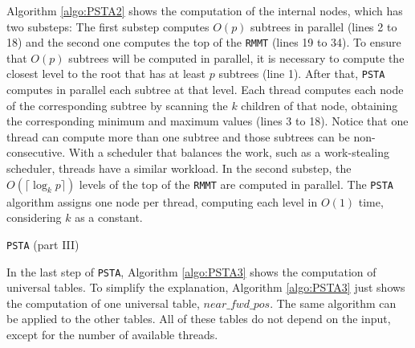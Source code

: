 Algorithm \ref{algo:PSTA2} shows the computation of the internal
nodes, which has two substeps: The first substep computes $O(p)$
subtrees in parallel (lines 2 to 18) and the second one computes the
top of the {\tt RMMT} (lines 19 to 34). To ensure that $O(p)$ subtrees
will be computed in parallel, it is necessary to compute the closest
level to the root that has at least $p$ subtrees (line 1). After that,
{\tt PSTA} computes in parallel each subtree at that level. Each
thread computes each node of the corresponding subtree by scanning the
$k$ children of that node, obtaining the corresponding minimum and
maximum values (lines 3 to 18). Notice that one thread can compute
more than one subtree and those subtrees can be non-consecutive. With
a scheduler that balances the work, such as a work-stealing scheduler,
threads have a similar workload. In the second substep, the $O(\lceil
\log_{k}p \rceil)$ levels of the top of the {\tt RMMT} are computed in
parallel. The {\tt PSTA} algorithm assigns one node per thread,
computing each level in $O(1)$ time, considering $k$ as a constant.


\begin{algorithm}[t]
\small
\SetVlineSkip{-2cm}
  \LinesNumbered
  \SetAlgoNoEnd
  \DontPrintSemicolon
  \BlankLine%


  \caption{{\tt PSTA} (part III)}
  \label{algo:PSTA3}
\end{algorithm}
\normalsize

In the last step of {\tt PSTA}, Algorithm \ref{algo:PSTA3} shows the computation of
universal tables. To simplify the explanation, Algorithm
\ref{algo:PSTA3} just shows the computation of one universal table,
$near\_fwd\_pos$. The same algorithm can be applied to the other
tables. All of these tables do not depend on the input, except for the
number of available threads.